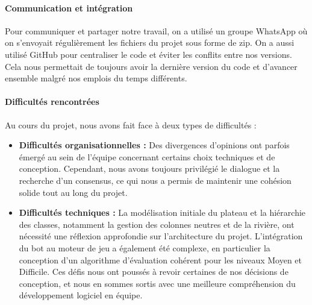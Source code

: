 \paragraph{Communication et intégration}
Pour communiquer et partager notre travail, on a utilisé un groupe WhatsApp où on s'envoyait régulièrement les fichiers du projet sous forme de zip. On a aussi utilisé GitHub pour centraliser le code et éviter les conflits entre nos versions. Cela nous permettait de toujours avoir la dernière version du code et d'avancer ensemble malgré nos emplois du temps différents.
\paragraph{Difficultés rencontrées}
Au cours du projet, nous avons fait face à deux types de difficultés :
\begin{itemize}
\item \textbf{Difficultés organisationnelles :} Des divergences d'opinions ont parfois émergé au sein de l'équipe concernant certains choix techniques et de conception. Cependant, nous avons toujours privilégié le dialogue et la recherche d'un consensus, ce qui nous a permis de maintenir une cohésion solide tout au long du projet.
\item \textbf{Difficultés techniques :} La modélisation initiale du plateau et la hiérarchie des classes, notamment la gestion des colonnes neutres et de la rivière, ont nécessité une réflexion approfondie sur l'architecture du projet. L'intégration du bot au moteur de jeu a également été complexe, en particulier la conception d'un algorithme d'évaluation cohérent pour les niveaux Moyen et Difficile. Ces défis nous ont poussés à revoir certaines de nos décisions de conception, et nous en sommes sortis avec une meilleure compréhension du développement logiciel en équipe.
\end{itemize}